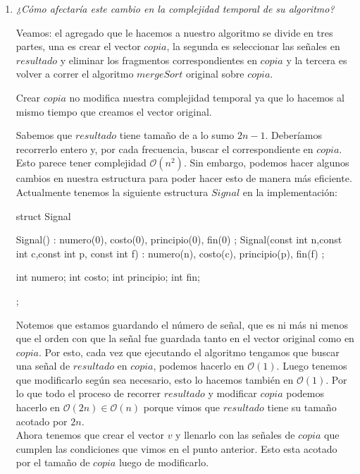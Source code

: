 \begin{enumerate}
		\item \textit{¿Cómo afectaría este cambio en la complejidad temporal de su algoritmo?}

    Veamos: el agregado que le hacemos a nuestro algoritmo se divide en tres partes, una es crear el vector $copia$, la segunda es seleccionar las señales en $resultado$ y eliminar los fragmentos correspondientes en $copia$ y la tercera es volver a correr el algoritmo $mergeSort$ original sobre $copia$.

    Crear $copia$ no modifica nuestra complejidad temporal ya que lo hacemos al mismo tiempo que creamos el vector original.

    Sabemos que $resultado$ tiene tamaño de a lo sumo $2n-1$. Deberíamos recorrerlo entero y, por cada frecuencia, buscar el correspondiente en $copia$. Esto parece tener complejidad $\mathcal{O}(n^2)$. Sin embargo, podemos hacer algunos cambios en nuestra estructura para poder hacer esto de manera más eficiente.\\

    Actualmente tenemos la siguiente estructura $Signal$ en la implementación: \\

            \begin{codesnippet}
struct Signal {
    Signal() : numero(0), costo(0), principio(0), fin(0) {};
    Signal(const int n,const int c,const int p, const int f) : numero(n),
    costo(c), principio(p), fin(f) {};

    int numero;
    int costo;
    int principio;
    int fin;
};
\end{codesnippet}

	Notemos que estamos guardando el número de señal, que es ni más ni menos que el orden con que la señal fue guardada tanto en el vector original como en $copia$. Por esto, cada vez que ejecutando el algoritmo tengamos que buscar una señal de $resultado$ en $copia$, podemos hacerlo en $\mathcal{O}(1)$. Luego tenemos que modificarlo según sea necesario, esto lo hacemos también en $\mathcal{O}(1)$. Por lo que todo el proceso de recorrer $resultado$ y modificar $copia$ podemos hacerlo en $\mathcal{O}(2n) \in \mathcal{O}(n)$ porque vimos que $resultado$ tiene su tamaño acotado por $2n$. \\

   Ahora tenemos que crear el vector $v$ y llenarlo con las señales de $copia$ que cumplen las condiciones que vimos en el punto anterior. Esto esta acotado por el tamaño de $copia$ luego de modificarlo.


\end{enumerate}
